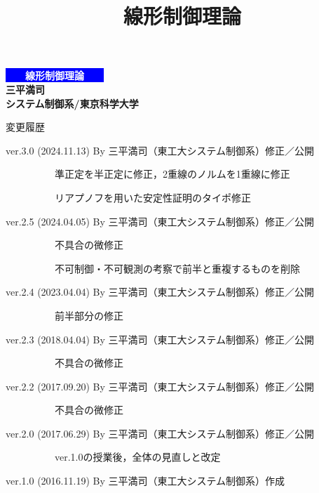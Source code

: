 \documentclass[dvipdfmx,cjk,10pt]{beamer}	%
\title[線形制御理論]
{\LARGE{線形制御理論}}
\author[Sampei (Science Tokyo) ver.3.0]{}  %
\institute[]{}
\date{}
\begin{document}

\begin{frame}[t] 



\begin{center}
\Huge \bf
\colorbox{blue}{\textcolor{white}{　　線形制御理論　　}}\\[5mm]
\Large
  三平満司\\
  システム制御系/東京科学大学
\end{center}

\hspace*{0.15\textwidth}
\begin{minipage}{0.7\textwidth}
{\footnotesize
変更履歴 %

ver.3.0 (2024.11.13) By 三平満司（東工大システム制御系）修正／公開

　　　　　準正定を半正定に修正，2重線のノルムを1重線に修正

　　　　　リアプノフを用いた安定性証明のタイポ修正

ver.2.5 (2024.04.05) By 三平満司（東工大システム制御系）修正／公開

　　　　　不具合の微修正

　　　　　不可制御・不可観測の考察で前半と重複するものを削除

ver.2.4 (2023.04.04) By 三平満司（東工大システム制御系）修正／公開

　　　　　前半部分の修正

ver.2.3 (2018.04.04) By 三平満司（東工大システム制御系）修正／公開

　　　　　不具合の微修正


ver.2.2 (2017.09.20) By 三平満司（東工大システム制御系）修正／公開

　　　　　不具合の微修正


ver.2.0 (2017.06.29) By 三平満司（東工大システム制御系）修正／公開

　　　　　ver.1.0の授業後，全体の見直しと改定

ver.1.0 (2016.11.19) By 三平満司（東工大システム制御系）作成

}
\end{minipage}

\end{frame}
\end{document}
